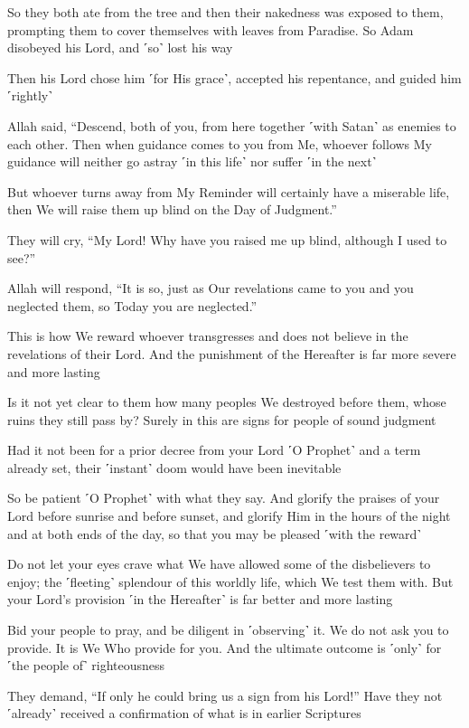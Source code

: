 So they both ate from the tree and then their nakedness was exposed to them, prompting them to cover themselves with leaves from Paradise. So Adam disobeyed his Lord, and ˹so˺ lost his way

Then his Lord chose him ˹for His grace˺, accepted his repentance, and guided him ˹rightly˺

Allah said, “Descend, both of you, from here together ˹with Satan˺ as enemies to each other. Then when guidance comes to you from Me, whoever follows My guidance will neither go astray ˹in this life˺ nor suffer ˹in the next˺

But whoever turns away from My Reminder will certainly have a miserable life, then We will raise them up blind on the Day of Judgment.”

They will cry, “My Lord! Why have you raised me up blind, although I used to see?”

Allah will respond, “It is so, just as Our revelations came to you and you neglected them, so Today you are neglected.”

This is how We reward whoever transgresses and does not believe in the revelations of their Lord. And the punishment of the Hereafter is far more severe and more lasting

Is it not yet clear to them how many peoples We destroyed before them, whose ruins they still pass by? Surely in this are signs for people of sound judgment

Had it not been for a prior decree from your Lord ˹O Prophet˺ and a term already set, their ˹instant˺ doom would have been inevitable

So be patient ˹O Prophet˺ with what they say. And glorify the praises of your Lord before sunrise and before sunset, and glorify Him in the hours of the night and at both ends of the day, so that you may be pleased ˹with the reward˺

Do not let your eyes crave what We have allowed some of the disbelievers to enjoy; the ˹fleeting˺ splendour of this worldly life, which We test them with. But your Lord’s provision ˹in the Hereafter˺ is far better and more lasting

Bid your people to pray, and be diligent in ˹observing˺ it. We do not ask you to provide. It is We Who provide for you. And the ultimate outcome is ˹only˺ for ˹the people of˺ righteousness

They demand, “If only he could bring us a sign from his Lord!” Have they not ˹already˺ received a confirmation of what is in earlier Scriptures

